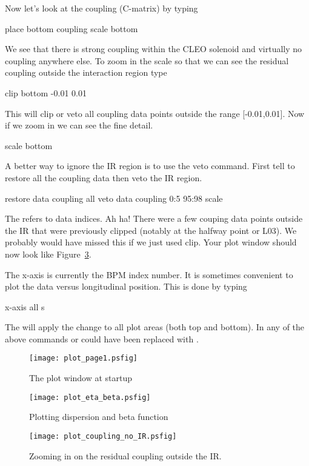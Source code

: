 Now let's look at the coupling (C-matrix) by typing
\begin{example}
  place bottom coupling
  scale bottom
\end{example}
We see that there is strong coupling within the CLEO solenoid and virtually no
coupling anywhere else. To zoom in the scale so that we can see the residual
coupling outside the interaction region type
\begin{example}
  clip bottom -0.01 0.01
\end{example}
This will clip or veto all coupling data points outside the range [-0.01,0.01].
Now if we zoom in we can see the fine detail.
\begin{example}
  scale bottom
\end{example}
A better way to ignore the IR region is to use the veto command. First tell \tao
to restore all the coupling data then veto the IR region.
\begin{example}
  restore data coupling all
  veto data coupling 0:5 95:98
  scale
\end{example}
The  refers to data indices. Ah ha! There were a few couping data points
outside the IR  that were previously
clipped (notably at the halfway point or L03). We probably would have missed
this if we just used clip. Your plot window should now look like
Figure~\ref{f:plot_coupling_no_IR}.

The x-axis is currently the BPM index number. It is sometimes convenient to plot
the data versus longitudinal position. This is done by typing
\begin{example}
  x-axis all s
\end{example}


The  will apply the change to all plot areas (both top and bottom). In
any of the above commands  or  could have been replaced
with .

\begin{figure}
  \centering
  \texttt{[image: plot\_page1.psfig]}
  \caption{The plot window at startup}
  \label{f:plot_begin}
\end{figure}

\begin{figure}
  \centering
  \texttt{[image: plot\_eta\_beta.psfig]}
  \caption{Plotting dispersion and beta function}
  \label{f:plot_eta_beta}
\end{figure}

\begin{figure}
  \centering
  \texttt{[image: plot\_coupling\_no\_IR.psfig]}
  \caption{Zooming in on the residual coupling outside the IR.}
  \label{f:plot_coupling_no_IR}
\end{figure}

